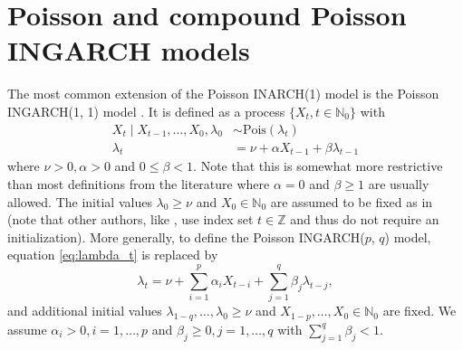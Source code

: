 \documentclass{article}
\begin{document}
\section{Poisson and compound Poisson INGARCH models}
\label{sec:original_formulation}

The most common extension of the Poisson INARCH(1) model is the Poisson INGARCH(1, 1) model \cite{Ferland2006, Fokianos2009}. It is defined as a process $\{X_t, t \in \mathbb{N}_0\}$ with
\begin{align}
X_t \mid X_{t - 1}, \dots, X_0, \lambda_0 & \sim \text{Pois}(\lambda_t)\label{eq:X_t_original}\\
\lambda_t & = \nu + \alpha X_{t - 1} + \beta \lambda_{t - 1} \label{eq:lambda_t}
\end{align}
where $\nu > 0, \alpha > 0$ and $0 \leq \beta < 1$. Note that this is somewhat more restrictive than most definitions from the literature where $\alpha = 0$ and $\beta \geq 1$ are usually allowed. The initial values $\lambda_0 \geq \nu$ and $X_0 \in \mathbb{N}_0$ are assumed to be fixed as in \cite{Fokianos2009} (note that other authors, like \citep{Ferland2006}, use index set $t \in \mathbb{Z}$ and thus do not require an initialization). More generally, to define the Poisson INGARCH($p$, $q$) model, equation \eqref{eq:lambda_t} is replaced by
\begin{equation}
\lambda_t = \nu + \sum_{i = 1}^p \alpha_i X_{t - i} + \sum_{j = 1}^q \beta_j \lambda_{t - j},\label{eq:lambda_t_pq}
\end{equation}
and additional initial values $\lambda_{1 - q}, \dots, \lambda_0 \geq \nu$ and $X_{1 - p}, \dots, X_0 \in \mathbb{N}_0$ are fixed. We assume $\alpha_i > 0, i = 1, \dots, p$ and $\beta_j \geq 0, j = 1, \dots, q$  with $\sum_{j = 1}^q \beta_j < 1$.
\end{document}
